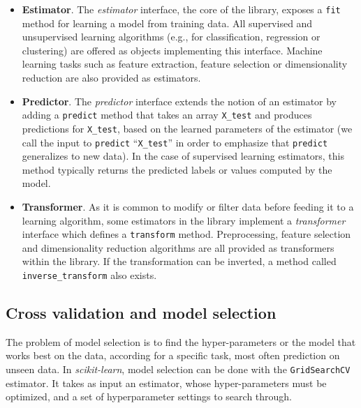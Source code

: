 \documentclass{frontiersSCNS} %
\begin{document}
\begin{itemize}
\item {\bf Estimator}. The \textit{estimator} interface, the core of the
    library, exposes a \texttt{fit} method for learning a model from training data.
    All supervised
    and unsupervised learning algorithms (e.g., for classification, regression or
    clustering) are offered as objects implementing this interface. Machine
    learning tasks such as feature extraction, feature selection or dimensionality
    reduction are also provided as estimators.

\item {\bf Predictor}. The \textit{predictor} interface extends the notion of an estimator
    by adding a \texttt{predict}
    method that takes an array \texttt{X\_test} and produces
    predictions for \texttt{X\_test}, based on the learned parameters of the
    estimator (we call the input to \texttt{predict} ``\texttt{X\_test}'' in order
    to emphasize that \texttt{predict} generalizes to new data). In the case of
    supervised learning estimators, this method typically returns the predicted
    labels or values computed by the model.

\item {\bf Transformer}. As it is common to modify or filter data before feeding it to a learning
    algorithm, some estimators in the library implement a \textit{transformer}
    interface which defines a \texttt{transform} method. Preprocessing, feature selection and
    dimensionality reduction
    algorithms are all provided as transformers within the library. If the transformation
    can be inverted, a method called \verb!inverse_transform! also exists.

\end{itemize}

\subsection{Cross validation and model selection}


The problem of model selection is to find the hyper-parameters or the
model that works best on the data, according for a specific task, most
often prediction on unseen data.
%
In {\em scikit-learn}, model selection can be done with the
\texttt{GridSearchCV} estimator. It takes as input an estimator, whose
hyper-parameters must be optimized, and a set of hyperparameter settings
to search through. 
\end{document}
